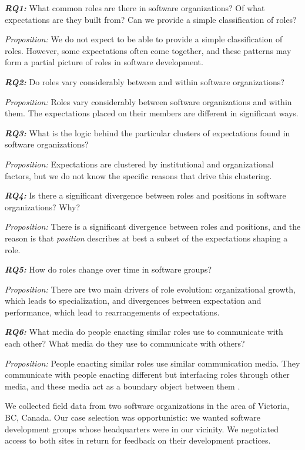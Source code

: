\documentclass[10pt, conference, compsocconf]{IEEEtran}
\begin{document}
\textbf{\emph{RQ1:}} What common roles are there in software organizations? Of what expectations are they built from? Can we provide a simple classification of roles?

\emph{Proposition:} We do not expect to be able to provide a simple classification of roles. However, some expectations often come together, and these patterns may form a partial picture of roles in software development.

\textbf{\emph{RQ2:}} Do roles vary considerably between and within software organizations?

\emph{Proposition:} Roles vary considerably between software organizations and within them. The expectations placed on their members are different in significant ways.

\textbf{\emph{RQ3:}} What is the logic behind the particular clusters of expectations found in software organizations?

\emph{Proposition:} Expectations are clustered by institutional and organizational factors, but we do not know the specific reasons that drive this clustering.

\textbf{\emph{RQ4:}} Is there a significant divergence between roles and positions in software organizations? Why?

\emph{Proposition:} There is a significant divergence between roles and positions, and the reason is that \emph{position} describes at best a subset of the expectations shaping a role.

\textbf{\emph{RQ5:}} How do roles change over time in software groups?

\emph{Proposition:} There are two main drivers of role evolution: organizational growth, which leads to specialization, and divergences between expectation and performance, which lead to rearrangements of expectations.

\textbf{\emph{RQ6:}} What media do people enacting similar roles use to communicate with each other? What media do they use to communicate with others?

\emph{Proposition:} People enacting similar roles use similar communication media. They communicate with people enacting different but interfacing roles through other media, and these media act as a boundary object between them \cite{Bowker1999}.

We collected field data from two software organizations in the area of Victoria, BC, Canada. Our case selection was opportunistic: we wanted software development groups whose headquarters were in our vicinity. We negotiated access to both sites in return for feedback on their development practices.
\end{document}
